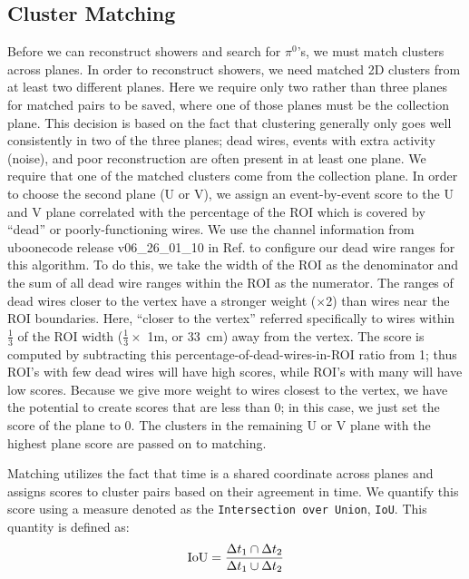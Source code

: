 \subsection{Cluster Matching}
Before we can reconstruct showers and search for $\pi^{0}$'s, we must match clusters across planes.  In order to reconstruct showers, we need matched 2D clusters from at least two different planes. Here we require only two rather than three planes for matched pairs to be saved, where one of those planes must be the collection plane. This decision is based on the fact that clustering generally only goes well consistently in two of the three planes; dead wires, events with extra activity (noise), and poor reconstruction are often present in at least one plane. We require that one of the matched clusters come from the collection plane.  In order to choose the second plane (U or V), we assign an event-by-event score to the U and V plane correlated with the percentage of the ROI which is covered by ``dead'' or poorly-functioning wires. We use the channel information from uboonecode release v06\_26\_01\_10 in Ref. \cite{bib:calibration_ref} to configure our dead wire ranges for this algorithm. 
 To do this, we take the width of the ROI as the denominator and the sum of all dead wire ranges within the ROI as the numerator. The ranges of dead wires closer to the vertex have a stronger weight ($\times$2) than wires near the ROI boundaries.  Here, “closer to the vertex” referred specifically to wires within $\frac{1}{3}$ of the ROI width ($\frac{1}{3} \times$ 1m, or 33~cm) away from the vertex. The score is computed by subtracting this percentage-of-dead-wires-in-ROI ratio from 1; thus ROI's with few dead wires will have high scores, while ROI's with many will have low scores.  Because we give more weight to wires closest to the vertex, we have the potential to create scores that are less than 0; in this case, we just set the score of the plane to 0. The clusters in the remaining U or V plane with the highest plane score are passed on to matching. 

\par Matching utilizes the fact that time is a shared coordinate across planes and assigns scores to cluster pairs based on their agreement in time. We quantify this score using a measure denoted as the \texttt{Intersection over Union}, \texttt{IoU}. This quantity is defined as:
\begin{equation}
  {\rm IoU} = \frac{ \Delta t_1 \cap \Delta t_2  }{ \Delta t_1 \cup \Delta t_2 }
\end{equation}

